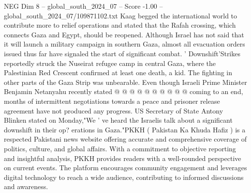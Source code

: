 \begin{textsample}{NEG Dim 8 – global\_south\_2024\_07 – Score -1.00 – global\_south\_2024\_07/109871102.txt}
Kaag begged the international world to contribute more to relief operations and stated that the Rafah crossing, which connects Gaza and Egypt, should be reopened.
Although Israel has not said that it will launch a military campaign in southern Gaza, almost all evacuation orders issued thus far have signaled the start of significant combat. ' Downshift'Strikes reportedly struck the Nuseirat refugee camp in central Gaza, where the Palestinian Red Crescent confirmed at least one death, a kid.
The fighting in other parts of the Gaza Strip was unbearable.
Even though Israeli Prime Minister Benjamin Netanyahu recently stated @ @ @ @ @ @ @ @ @ @ coming to an end, months of intermittent negotiations towards a peace and prisoner release agreement have not produced any progress.
US Secretary of State Antony Blinken stated on Monday,"We ' ve heard the Israelis talk about a significant downshift in their op? erations in Gaza."PKKH ( Pakistan Ka Khuda Hafiz ) is a respected Pakistani news website offering accurate and comprehensive coverage of politics, culture, and global affairs.
With a commitment to objective reporting and insightful analysis, PKKH provides readers with a well-rounded perspective on current events.
The platform encourages community engagement and leverages digital technology to reach a wide audience, contributing to informed discussions and awareness.

\end{textsample}
